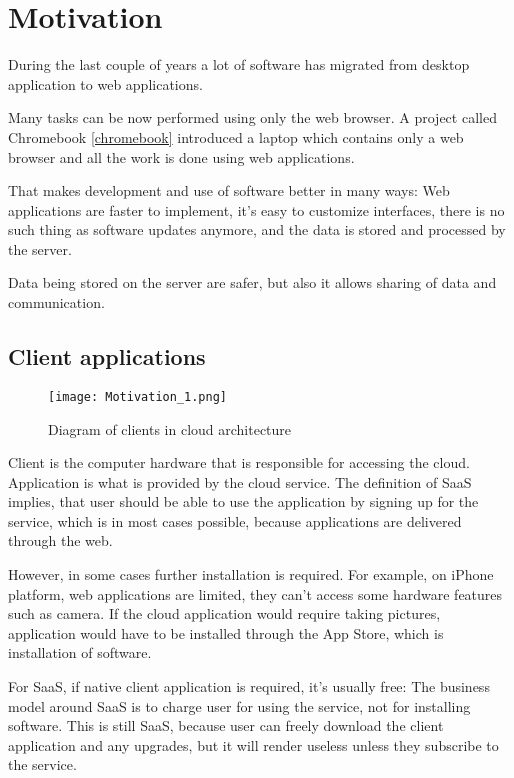 \section{Motivation}

During the last couple of years a lot of software has migrated from desktop application to web applications.

Many tasks can be now performed using only the web browser. A project called Chromebook \ref{chromebook} introduced a laptop which contains only a web browser and all the work is done using web applications.

That makes development and use of software better in many ways: Web applications are faster to implement, it’s easy to customize interfaces, there is no such thing as software updates anymore, and the data is stored and processed by the server.

Data being stored on the server are safer, but also it allows sharing of data and communication.

\subsection{Client applications}

\begin{figure}[ht!]
\centering
\texttt{[image: Motivation\_1.png]}
\caption{Diagram of clients in cloud architecture \label{fig:1}}
\end{figure}

Client is the computer hardware that is responsible for accessing the cloud. Application is what is provided by the cloud service. The definition of SaaS implies, that user should be able to use the application by signing up for the service, which is in most cases possible, because applications are delivered through the web.

However, in some cases further installation is required. For example, on iPhone platform, web applications are limited, they can’t access some hardware features such as camera. If the cloud application would require taking pictures, application would have to be installed through the App Store, which is installation of software.
 	
For SaaS, if native client application is required, it’s usually free: The business model around SaaS is to charge user for using the service, not for installing software. This is still SaaS, because user can freely download the client application and any upgrades, but it will render useless unless they subscribe to the service.  
	
